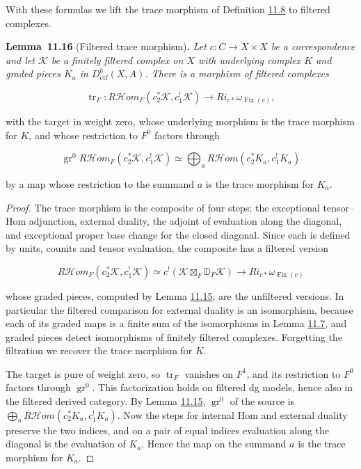 \documentclass[11pt]{article}
\newenvironment{bpstatement}[2]{\par\addvspace{0.6\baselineskip}\noindent\textbf{#1}#2\textbf{.}\enspace\ignorespaces}
  {\par\addvspace{0.4\baselineskip}}
\newenvironment{bpstatementit}[2]{\begin{bpstatement}{#1}{#2}\itshape\ignorespaces}{\end{bpstatement}}
\providecommand{\Fix}{}\renewcommand{\Fix}{\operatorname{Fix}}
\providecommand{\cHom}{}\renewcommand{\cHom}{R\mathcal{H}\!om}
\begin{document}
\label{bp213}%
With these formulas we lift the trace morphism of Definition \hyperref[bp194]{11.8} to filtered complexes.

\label{bp214}%
\begin{bpstatementit}{Lemma~11.16}{ (Filtered trace morphism)}
Let \(c:C\to X\times X\) be a correspondence and let \(\mathcal K\) be a finitely filtered complex on \(X\) with underlying complex \(K\) and graded pieces \(K_a\) in \(D^b_{\mathrm{ctf}}(X,A)\). There is a morphism of filtered complexes

\[
\operatorname{tr}_F:
\cHom_F(c_2^*\mathcal K,c_1^!\mathcal K)\longrightarrow
Ri_{c*}\omega_{\Fix(c)},
\]

with the target in weight zero, whose underlying morphism is the trace morphism for \(K\), and whose restriction to \(F^0\) factors through

\[
\operatorname{gr}^0\cHom_F(c_2^*\mathcal K,c_1^!\mathcal K)
\simeq\bigoplus_a\cHom(c_2^*K_a,c_1^!K_a)
\]

by a map whose restriction to the summand \(a\) is the trace morphism for \(K_a\).
\end{bpstatementit}

\begin{proof}[{Proof}]\label{bp215}%
The trace morphism is the composite of four steps: the exceptional tensor–Hom adjunction, external duality, the adjoint of evaluation along the diagonal, and exceptional proper base change for the closed diagonal. Since each is defined by units, counits and tensor evaluation, the composite has a filtered version

\[
\cHom_F(c_2^*\mathcal K,c_1^!\mathcal K)
\simeq c^!(\mathcal K\boxtimes_F\mathbb D_F\mathcal K)
\longrightarrow Ri_{c*}\omega_{\Fix(c)}
\]

whose graded pieces, computed by Lemma \hyperref[bp211]{11.15}, are the unfiltered versions. In particular the filtered comparison for external duality is an isomorphism, because each of its graded maps is a finite sum of the isomorphisms in Lemma \hyperref[bp191]{11.7}, and graded pieces detect isomorphisms of finitely filtered complexes. Forgetting the filtration we recover the trace morphism for \(K\).

The target is pure of weight zero, so \(\operatorname{tr}_F\) vanishes on \(F^1\), and its restriction to \(F^0\) factors through \(\operatorname{gr}^0\). This factorization holds on filtered dg models, hence also in the filtered derived category. By Lemma \hyperref[bp211]{11.15}, \(\operatorname{gr}^0\) of the source is \(\bigoplus_a\cHom(c_2^*K_a,c_1^!K_a)\). Now the steps for internal Hom and external duality preserve the two indices, and on a pair of equal indices evaluation along the diagonal is the evaluation of \(K_a\). Hence the map on the summand \(a\) is the trace morphism for \(K_a\).
\end{proof}
\end{document}
